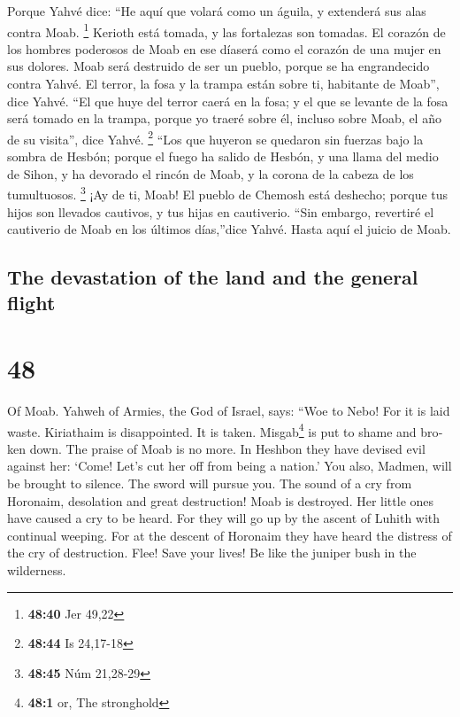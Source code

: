 \begin{paracol}{2}
 Porque Yahvé dice: ``He aquí que volará como un águila,
y extenderá sus alas contra Moab. \footnote{\textbf{48:40} Jer 49,22}
 Kerioth está tomada, y las fortalezas son tomadas. El
corazón de los hombres poderosos de Moab en ese díaserá como el corazón
de una mujer en sus dolores.  Moab será destruido de ser
un pueblo, porque se ha engrandecido contra Yahvé.  El
terror, la fosa y la trampa están sobre ti, habitante de Moab'', dice
Yahvé.  ``El que huye del terror caerá en la fosa; y el
que se levante de la fosa será tomado en la trampa, porque yo traeré
sobre él, incluso sobre Moab, el año de su visita'', dice Yahvé.
\footnote{\textbf{48:44} Is 24,17-18}  ``Los que huyeron
se quedaron sin fuerzas bajo la sombra de Hesbón; porque el fuego ha
salido de Hesbón, y una llama del medio de Sihon, y ha devorado el
rincón de Moab, y la corona de la cabeza de los tumultuosos. \footnote{\textbf{48:45}
  Núm 21,28-29}  ¡Ay de ti, Moab! El pueblo de Chemosh
está deshecho; porque tus hijos son llevados cautivos, y tus hijas en
cautiverio.  ``Sin embargo, revertiré el cautiverio de
Moab en los últimos días,''dice Yahvé. Hasta aquí el juicio de Moab.

\switchcolumn
\begin{otherlanguage}{english}

\hypertarget{the-devastation-of-the-land-and-the-general-flight}{%
\subsection{The devastation of the land and the general
flight}\label{the-devastation-of-the-land-and-the-general-flight}}

\hypertarget{section-95}{%
\section{48}\label{section-95}}

 Of Moab. Yahweh of Armies, the God of Israel, says: ``Woe
to Nebo! For it is laid waste. Kiriathaim is disappointed. It is taken.
Misgab\footnote{\textbf{48:1} or, The stronghold} is put to shame and
broken down.  The praise of Moab is no more. In Heshbon
they have devised evil against her: `Come! Let's cut her off from being
a nation.' You also, Madmen, will be brought to silence. The sword will
pursue you.  The sound of a cry from Horonaim, desolation
and great destruction!  Moab is destroyed. Her little ones
have caused a cry to be heard.  For they will go up by the
ascent of Luhith with continual weeping. For at the descent of Horonaim
they have heard the distress of the cry of destruction. 
Flee! Save your lives! Be like the juniper bush in the wilderness.


\end{otherlanguage}
\end{paracol}
